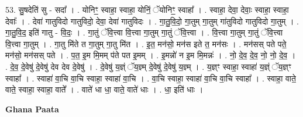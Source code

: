 \documentclass[17pt]{extarticle}
\begin{document}
53. सु॒षदेति॑ सु - सदा᳚ । . योनिꣳ॒॒ स्वाहा॒ स्वाहा॒ योनिं॒ ॅयोनिꣳ॒॒ स्वाहा᳚ । . स्वाहा॒ देवा॒ देवाः॒ स्वाहा॒ स्वाहा॒ देवाः᳚ । . देवा॑ गातुविदो गातुविदो॒ देवा॒ देवा॑ गातुविदः । . गा॒तु॒वि॒दो॒ गा॒तुम् गा॒तुम् गा॑तुविदो गातुविदो गा॒तुम् । . गा॒तु॒वि॒द॒ इति॑ गातु - वि॒दः॒ । . गा॒तुं ॅवि॒त्त्वा वि॒त्त्वा गा॒तुम् गा॒तुं ॅवि॒त्त्वा । . वि॒त्त्वा गा॒तुम् गा॒तुं ॅवि॒त्त्वा वि॒त्त्वा गा॒तुम् । . गा॒तु मि॑ते त गा॒तुम् गा॒तु मि॑त । . इ॒त॒ मन॑सो॒ मन॑स इते त॒ मन॑सः । . मन॑सस् पते पते॒ मन॑सो॒ मन॑सस् पते । . प॒त॒ इ॒म मि॒मम् प॑ते पत इ॒मम् । . इ॒मन्नो॑ न इ॒म मि॒मन्नः॑ । . नो॒ दे॒व॒ दे॒व॒ नो॒ नो॒ दे॒व॒ । . दे॒व॒ दे॒वेषु॑ दे॒वेषु॑ देव देव दे॒वेषु॑ । . दे॒वेषु॑ य॒ज्ञ्ं ॅय॒ज्ञ्म् दे॒वेषु॑ दे॒वेषु॑ य॒ज्ञ्म् । . य॒ज्ञ्ꣳ स्वाहा॒ स्वाहा॑ य॒ज्ञ्ं ॅय॒ज्ञ्ꣳ स्वाहा᳚ । . स्वाहा॑ वा॒चि वा॒चि स्वाहा॒ स्वाहा॑ वा॒चि । . वा॒चि स्वाहा॒ स्वाहा॑ वा॒चि वा॒चि स्वाहा᳚ । . स्वाहा॒ वाते॒ वाते॒ स्वाहा॒ स्वाहा॒ वाते᳚ । . वाते॑ धा धा॒ वाते॒ वाते॑ धाः । . धा॒ इति॑ धाः । \newline

\textbf{Ghana Paata } \newline
\end{document}

